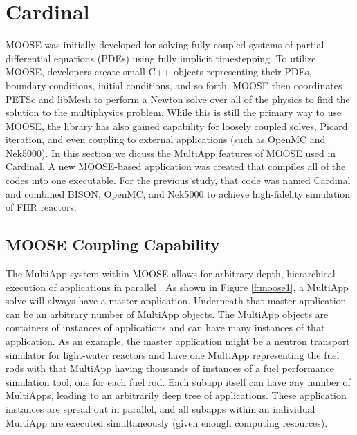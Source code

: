 \section{Cardinal}
\label{s:cardinal}

MOOSE was initially developed for solving fully coupled systems of partial differential equations (PDEs) using fully implicit timestepping. To utilize MOOSE, developers create small C++ objects representing their PDEs, boundary conditions, initial conditions, and so forth. MOOSE then coordinates PETSc and libMesh \cite{kirk2006libmesh} to perform a Newton solve over all of the physics to find the solution to the multiphysics problem. While this is still the primary way to use MOOSE, the library has also gained capability for loosely coupled solves, Picard iteration, and even coupling to external applications (such as OpenMC and Nek5000). 
In this section we dicuss
the MultiApp features of MOOSE used in Cardinal.
A new MOOSE-based application was created \cite{cardinal}  that compiles all of the codes into one executable. For the previous study, that code was named Cardinal and combined BISON, OpenMC, and Nek5000 to achieve high-fidelity simulation of FHR reactors.

\subsection{MOOSE Coupling Capability}

The MultiApp system within MOOSE allows for arbitrary-depth, hierarchical execution of applications in parallel \cite{gaston2015physics}. As shown in Figure \ref{f:moose1}, a MultiApp solve will always have a master application. Underneath that master application can be an arbitrary number of MultiApp objects. The MultiApp objects are containers of instances of applications and can have many instances of that application. As an example, the master application might be a neutron transport simulator for light-water reactors and have one MultiApp representing the fuel rods with that MultiApp having thousands of instances of a fuel performance simulation tool, one for each fuel rod. Each subapp itself can have any number of MultiApps, leading to an arbitrarily deep tree of applications. These application instances are spread out in parallel, and all subapps within an individual MultiApp are executed simultaneously (given enough computing resources).

